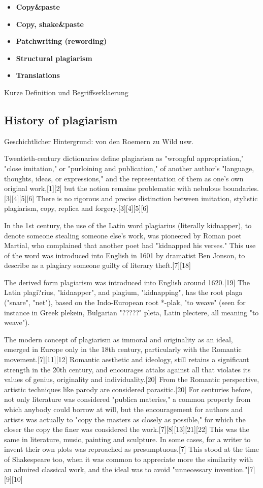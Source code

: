 \begin{itemize}
\item \textbf{Copy\&paste}
\item \textbf{Copy, shake\&paste}
\item \textbf{Patchwriting (rewording)}
\item \textbf{Structural plagiarism}
\item \textbf{Translations}
\end{itemize}




Kurze Definition und Begriffserklaerung 
	\subsection{History of plagiarism} 
	Geschichtlicher Hintergrund: von den Roemern zu Wild usw. 	
	
	
	Twentieth-century dictionaries define plagiarism as "wrongful appropriation," "close imitation," or "purloining and publication," of another author's "language, thoughts, ideas, or expressions," and the representation of them as one's own original work,[1][2] but the notion remains problematic with nebulous boundaries.[3][4][5][6] There is no rigorous and precise distinction between imitation, stylistic plagiarism, copy, replica and forgery.[3][4][5][6]

In the 1st century, the use of the Latin word plagiarius (literally kidnapper), to denote someone stealing someone else's work, was pioneered by Roman poet Martial, who complained that another poet had "kidnapped his verses." This use of the word was introduced into English in 1601 by dramatist Ben Jonson, to describe as a plagiary someone guilty of literary theft.[7][18]

The derived form plagiarism was introduced into English around 1620.[19] The Latin plagi?rius, "kidnapper", and plagium, "kidnapping", has the root plaga ("snare", "net"), based on the Indo-European root *-plak, "to weave" (seen for instance in Greek plekein, Bulgarian "?????" pleta, Latin plectere, all meaning "to weave").

The modern concept of plagiarism as immoral and originality as an ideal, emerged in Europe only in the 18th century, particularly with the Romantic movement.[7][11][12] Romantic aesthetic and ideology, still retains a significant strength in the 20th century, and encourages attaks against all that violates its values of genius, originality and individuality.[20] From the Romantic perspective, artistic techniques like parody are considered parasitic.[20] For centuries before, not only literature was considered "publica materies," a common property from which anybody could borrow at will, but the encouragement for authors and artists was actually to "copy the masters as closely as possible," for which the closer the copy the finer was considered the work.[7][8][13][21][22] This was the same in literature, music, painting and sculpture. In some cases, for a writer to invent their own plots was reproached as presumptuous.[7] This stood at the time of Shakespeare too, when it was common to appreciate more the similarity with an admired classical work, and the ideal was to avoid "unnecessary invention."[7][9][10]

